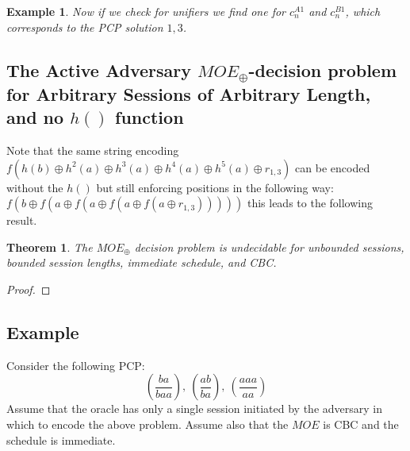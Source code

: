 \documentclass[11pt,twoside,a4paper]{article}
\newtheorem{example}{Example}
\newtheorem{theorem}{Theorem}
\begin{document}
{\begin{example}
		Now if we check for unifiers we find one for $c^{A1}_n$ and 
		$c^{B1}_n$, which corresponds to the PCP solution $1,3$.
		
\end{example}
\subsection{The Active Adversary $MOE_{\oplus}$-decision problem for Arbitrary Sessions of Arbitrary Length, and no $h()$ function}

Note that the same string encoding $f(h(b) \oplus h^2(a) 
\oplus h^3(a) \oplus h^4(a) \oplus h^5(a)
\oplus r_{1,3})$ can be encoded without the $h()$ but still enforcing
positions in the following way: 
$f(b \oplus f(a \oplus f(a \oplus f(a \oplus f(a \oplus r_{1,3})))))$ 
this leads to the following result.

\begin{theorem}\label{thm:bounded_unbounded}
	The $MOE_{\oplus}$ decision problem is undecidable for unbounded 
	sessions, bounded session lengths, immediate schedule, and CBC.	
\end{theorem}
\begin{proof}
\end{proof}
\vfill
\pagebreak
\subsection{Example}
Consider the following PCP:
\[
(\frac{ba}{baa}),~(\frac{ab}{ba}),~(\frac{aaa}{aa})
\] 
Assume that the oracle has only a single session initiated by the 
adversary in which to encode the above problem. Assume also that the
$MOE$ is CBC and the schedule is immediate.  

}
\end{document}
